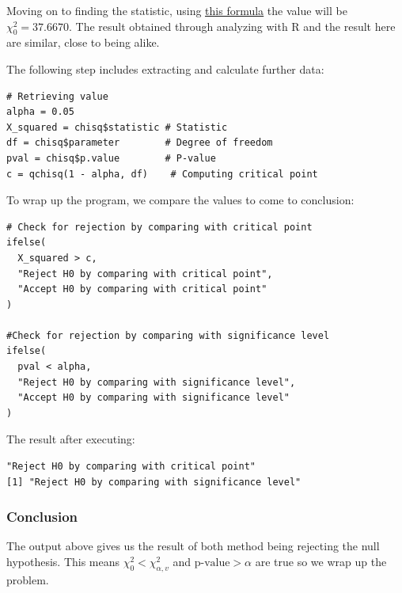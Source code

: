 \documentclass[a4paper]{article}
\numberwithin{equation}{section}
\begin{document}
Moving on to finding the statistic, using \hyperref[chi:stat]{\underline{this formula}} the value will be \( \chi_0^2 = 37.6670\). The result obtained through analyzing with R and the result here are similar, close to being alike.

The following step includes extracting and calculate further data:
\begin{mdframed}[leftline=false,rightline=false,backgroundcolor=magenta!10,nobreak=true]
  \begin{verbatim}
# Retrieving value
alpha = 0.05
X_squared = chisq$statistic # Statistic
df = chisq$parameter        # Degree of freedom
pval = chisq$p.value        # P-value
c = qchisq(1 - alpha, df)    # Computing critical point
  \end{verbatim}
\end{mdframed}

To wrap up the program, we compare the values to come to conclusion:
\begin{mdframed}[leftline=false,rightline=false,backgroundcolor=magenta!10,nobreak=true]
  \begin{verbatim}
# Check for rejection by comparing with critical point
ifelse(
  X_squared > c,
  "Reject H0 by comparing with critical point",
  "Accept H0 by comparing with critical point"
)

#Check for rejection by comparing with significance level
ifelse(
  pval < alpha,
  "Reject H0 by comparing with significance level",
  "Accept H0 by comparing with significance level"
)
  \end{verbatim}
\end{mdframed}

The result after executing:
\begin{mdframed}[leftline=false,rightline=false,backgroundcolor=gray!10,nobreak=true]
  \begin{verbatim}
"Reject H0 by comparing with critical point"
[1] "Reject H0 by comparing with significance level"
  \end{verbatim}
\end{mdframed}

\subsubsection{Conclusion}
The output above gives us the result of both method being rejecting the null hypothesis. This means \(\chi_0^2 < \chi_{\alpha, v}^2\) and \(\text{p-value} > \alpha \) are true so we wrap up the problem.
\end{document}
